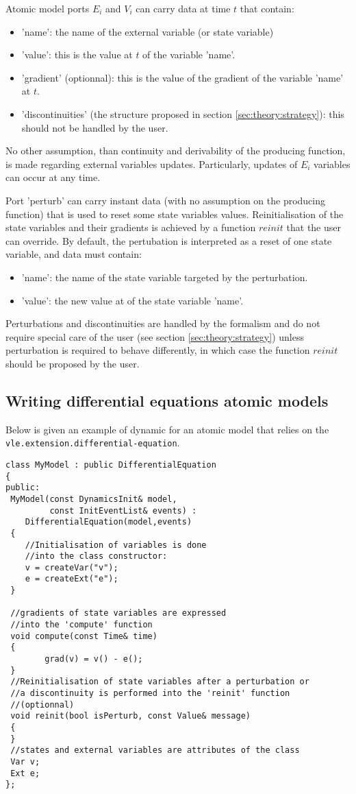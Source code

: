 \documentclass{article}
\theoremstyle{remark}
\begin{document}
Atomic model ports $E_i$ and $V_i$ can carry data at time $t$ that contain:
\begin{itemize}
  \item 'name': the name of the external variable (or state variable)
  \item 'value': this is the value at $t$ of the variable 'name'.
  \item 'gradient' (optionnal): this is the value of the gradient of
  the variable 'name' at $t$.
  \item 'discontinuities' (the structure proposed in
  section \ref{sec:theory:strategy}): this should not be handled by the user.
\end{itemize} 
No other assumption, than continuity and derivability of the producing
function, is made regarding external variables updates. Particularly, updates of
$E_i$ variables can occur at any time.
   
Port 'perturb' can carry instant data (with no assumption on the producing
function) that is used to reset some state variables values. Reinitialisation 
of the state variables and their gradients is achieved by a function $reinit$
that the user can override. By default, the pertubation is interpreted as a  
reset of one state variable, and data must contain:
\begin{itemize}
  \item 'name': the name of the state variable targeted by the perturbation.
  \item 'value': the new value at of the state variable 'name'.
\end{itemize} 
Perturbations and discontinuities are handled by the formalism and do not
require special care of the user (see section \ref{sec:theory:strategy}) unless
perturbation is required to behave differently, in which case the function
$reinit$ should be proposed by the user.

\subsection{Writing differential equations atomic models}
\label{sec:user:diff}

Below is given an example of dynamic for an atomic model that relies 
on the {\tt vle.extension.differential-equation}.

\begin{lstlisting}
class MyModel : public DifferentialEquation
{
public:
 MyModel(const DynamicsInit& model,
	     const InitEventList& events) :
    DifferentialEquation(model,events)
 {
 	//Initialisation of variables is done 
 	//into the class constructor:
	v = createVar("v");
	e = createExt("e");
 }
 
 //gradients of state variables are expressed 
 //into the 'compute' function 
 void compute(const Time& time)
 {
    	grad(v) = v() - e();
 }
 //Reinitialisation of state variables after a perturbation or 
 //a discontinuity is performed into the 'reinit' function
 //(optionnal)
 void reinit(bool isPerturb, const Value& message) 
 {
 }
 //states and external variables are attributes of the class
 Var v;
 Ext e;
};
\end{lstlisting}
\end{document}
